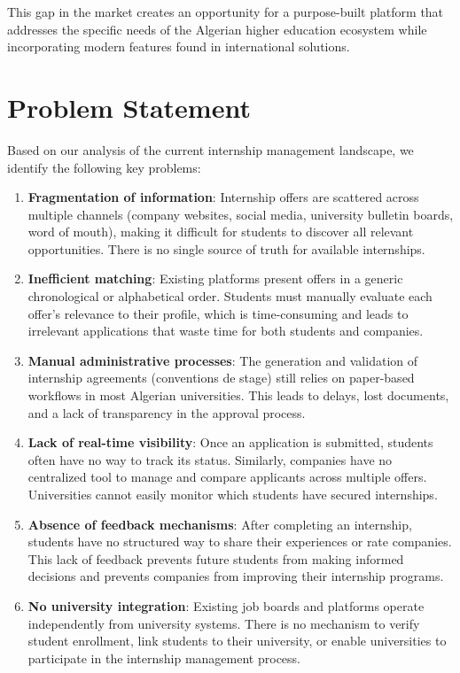 This gap in the market creates an opportunity for a purpose-built platform that addresses the specific needs of the Algerian higher education ecosystem while incorporating modern features found in international solutions.

\section{Problem Statement}

Based on our analysis of the current internship management landscape, we identify the following key problems:

\begin{enumerate}
    \item \textbf{Fragmentation of information}: Internship offers are scattered across multiple channels (company websites, social media, university bulletin boards, word of mouth), making it difficult for students to discover all relevant opportunities. There is no single source of truth for available internships.

    \item \textbf{Inefficient matching}: Existing platforms present offers in a generic chronological or alphabetical order. Students must manually evaluate each offer's relevance to their profile, which is time-consuming and leads to irrelevant applications that waste time for both students and companies.

    \item \textbf{Manual administrative processes}: The generation and validation of internship agreements (conventions de stage) still relies on paper-based workflows in most Algerian universities. This leads to delays, lost documents, and a lack of transparency in the approval process.

    \item \textbf{Lack of real-time visibility}: Once an application is submitted, students often have no way to track its status. Similarly, companies have no centralized tool to manage and compare applicants across multiple offers. Universities cannot easily monitor which students have secured internships.

    \item \textbf{Absence of feedback mechanisms}: After completing an internship, students have no structured way to share their experiences or rate companies. This lack of feedback prevents future students from making informed decisions and prevents companies from improving their internship programs.

    \item \textbf{No university integration}: Existing job boards and platforms operate independently from university systems. There is no mechanism to verify student enrollment, link students to their university, or enable universities to participate in the internship management process.
\end{enumerate}

